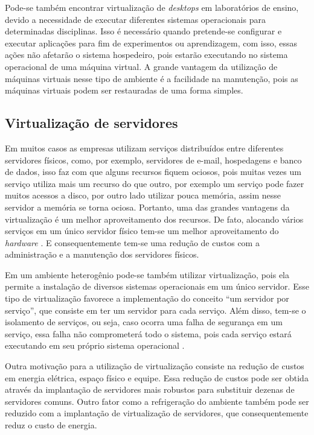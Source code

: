 Pode-se também encontrar virtualização de \textit{desktops} em laboratórios de ensino, devido a necessidade de executar diferentes sistemas 
operacionais para determinadas disciplinas. Isso é necessário quando pretende-se configurar e executar aplicações para fim de experimentos ou
aprendizagem, com isso, essas ações não afetarão o sistema hospedeiro, pois estarão executando no sistema operacional de uma máquina virtual. 
A grande vantagem da utilização de máquinas virtuais nesse tipo de ambiente é a facilidade na manutenção, pois as máquinas virtuais podem
ser restauradas de uma forma simples.

\subsection{Virtualização de servidores}
\label{section:virtdesk}

Em muitos casos as empresas utilizam serviços distribuídos entre diferentes servidores físicos, como, por exemplo, servidores de e-mail, 
hospedagens e banco de dados, isso faz com que alguns recursos fiquem ociosos, pois muitas vezes um serviço utiliza mais um recurso do que outro,
por exemplo um serviço pode fazer muitos acessos a disco, por outro lado utilizar pouca memória, assim nesse servidor a memória se torna ociosa. 
Portanto, uma das grandes vantagens da virtualização é um melhor aproveitamento dos recursos. De fato, alocando vários serviços em um único 
servidor físico tem-se um melhor aproveitamento do \textit{hardware} \cite{moreira2006}. E consequentemente tem-se uma redução de custos com a 
administração e a manutenção dos servidores físicos.

Em um ambiente heterogênio pode-se também utilizar virtualização, pois ela permite a instalação de diversos sistemas operacionais em um 
único servidor. Esse tipo de virtualização favorece a implementação do conceito ``um servidor por serviço'', que consiste em ter um servidor 
para cada serviço. Além disso, tem-se o isolamento de serviços, ou seja, caso ocorra uma falha de segurança em um serviço, essa falha não 
comprometerá todo o sistema, pois cada serviço estará executando em seu próprio sistema operacional \cite{carissimi2008}.

Outra motivação para a utilização de virtualização consiste na redução de custos em energia elétrica, espaço físico e equipe. Essa redução de
custos pode ser obtida através da implantação de servidores mais robustos para substituir dezenas de servidores comuns. Outro fator como a
refrigeração do ambiente também pode ser reduzido com a implantação de virtualização de servidores, que consequentemente reduz o 
custo de energia.

